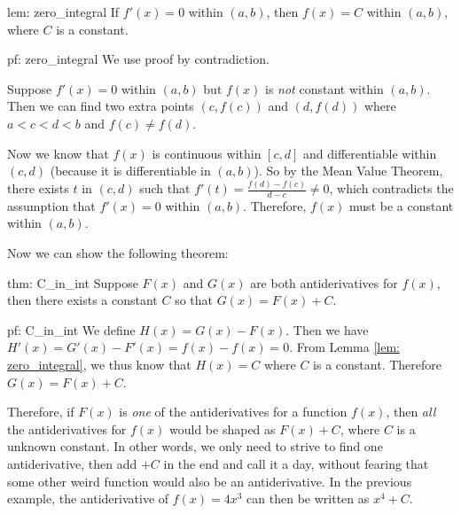 \newpage

\begin{lem}{lem: zero_integral}
    If $f'(x) = 0$ within $(a,b)$, then $f(x) = C$ within $(a,b)$, where $C$ is a constant.
\end{lem}

\begin{prf}[]{pf: zero_integral}
    We use proof by contradiction.  
    
    Suppose $f'(x) = 0$ within $(a, b)$ but $f(x)$ is \textit{not} constant within $(a, b)$.  Then we can find two extra points $(c, f(c))$ and $(d, f(d))$ where $a < c < d < b$ and $f(c) \ne f(d)$.  
    
    Now we know that $f(x)$ is continuous within $[c, d]$ and differentiable within $(c, d)$ (because it is differentiable in $(a, b)$).  So by the Mean Value Theorem, there exists $t$ in $(c, d)$ such that $f'(t) = \frac{f(d)-f(c)}{d-c} \ne 0$, which contradicts the assumption that $f'(x) = 0$ within $(a, b)$.  Therefore, $f(x)$ must be a constant within $(a, b)$. 
\end{prf}

Now we can show the following theorem:

\begin{theo}{thm: C_in_int}
    Suppose $F(x)$ and $G(x)$ are both antiderivatives for $f(x)$, then there exists a constant $C$ so that $G(x) = F(x) + C$.
\end{theo}

\begin{prf}[]{pf: C_in_int}
    We define $H(x) = G(x) - F(x)$.  Then we have $H'(x) = G'(x) - F'(x) = f(x) - f(x) = 0$.  From Lemma \ref{lem: zero_integral}, we thus know that $H(x) = C$ where $C$ is a constant.  Therefore $G(x) = F(x) + C$.
\end{prf}

Therefore, if $F(x)$ is \textit{one} of the antiderivatives for a function $f(x)$, then \textit{all} the antiderivatives for $f(x)$ would be shaped as $F(x) + C$, where $C$ is a unknown constant.  In other words, we only need to strive to find one antiderivative, then add $+C$ in the end and call it a day, without fearing that some other weird function would also be an antiderivative.  In the previous example, the antiderivative of $f(x) = 4x^3$ can then be written as $x^4 + C$.

